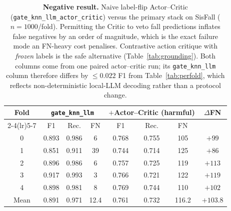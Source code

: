 \begin{table}[!t]
\centering
\caption{\textbf{Negative result.} Naive label-flip Actor--Critic (\texttt{gate\_knn\_llm\_actor\_critic}) versus the primary stack on SisFall ($n{=}1000$/fold). Permitting the Critic to veto fall predictions inflates false negatives by an order of magnitude, which is the exact failure mode an FN-heavy cost penalises. Contrastive action critique with \emph{frozen} labels is the safe alternative (Table~\ref{tab:grounding}). Both columns come from one paired actor--critic run; its \texttt{gate\_knn\_llm} column therefore differs by ${\le}0.022$ F1 from Table~\ref{tab:perfold}, which reflects non-deterministic local-LLM decoding rather than a protocol change.}
\label{tab:negative}
\begin{tabular}{c ccc ccc c}
\toprule
Fold & \multicolumn{3}{c}{\texttt{gate\_knn\_llm}} & \multicolumn{3}{c}{$+$Actor--Critic (harmful)} & $\Delta$FN \\
\cmidrule(lr){2-4}\cmidrule(lr){5-7}
 & F1 & Rec. & FN & F1 & Rec. & FN & \\
\midrule
0 & 0.893 & 0.986 & 6  & 0.768 & 0.755 & 105 & $+99$  \\
1 & 0.851 & 0.911 & 39 & 0.744 & 0.714 & 125 & $+86$  \\
2 & 0.896 & 0.986 & 6  & 0.757 & 0.725 & 119 & $+113$ \\
3 & 0.917 & 0.993 & 3  & 0.766 & 0.721 & 122 & $+119$ \\
4 & 0.898 & 0.981 & 8  & 0.769 & 0.744 & 110 & $+102$ \\
\midrule
Mean & 0.891 & 0.971 & 12.4 & 0.761 & 0.732 & 116.2 & $+103.8$ \\
\bottomrule
\end{tabular}
\end{table}
